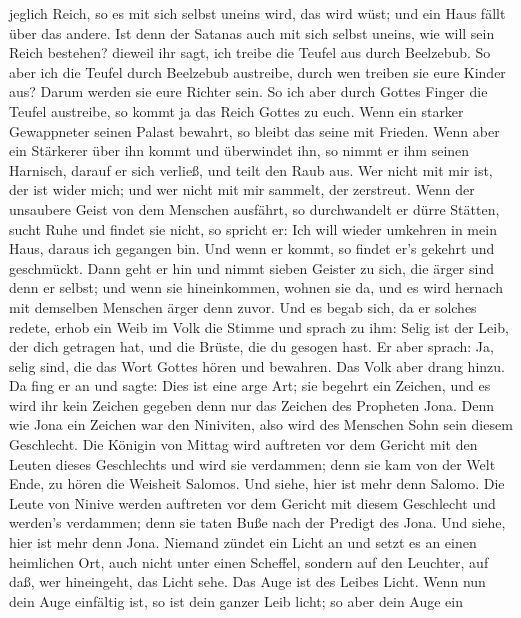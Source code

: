 jeglich Reich, so es mit sich selbst uneins wird, das wird wüst; und ein
Haus fällt über das andere.  Ist denn der Satanas auch mit
sich selbst uneins, wie will sein Reich bestehen? dieweil ihr sagt, ich
treibe die Teufel aus durch Beelzebub.  So aber ich die
Teufel durch Beelzebub austreibe, durch wen treiben sie eure Kinder aus?
Darum werden sie eure Richter sein.  So ich aber durch
Gottes Finger die Teufel austreibe, so kommt ja das Reich Gottes zu
euch.  Wenn ein starker Gewappneter seinen Palast bewahrt,
so bleibt das seine mit Frieden.  Wenn aber ein Stärkerer
über ihn kommt und überwindet ihn, so nimmt er ihm seinen Harnisch,
darauf er sich verließ, und teilt den Raub aus.  Wer nicht
mit mir ist, der ist wider mich; und wer nicht mit mir sammelt, der
zerstreut.  Wenn der unsaubere Geist von dem Menschen
ausfährt, so durchwandelt er dürre Stätten, sucht Ruhe und findet sie
nicht, so spricht er: Ich will wieder umkehren in mein Haus, daraus ich
gegangen bin.  Und wenn er kommt, so findet er's gekehrt
und geschmückt.  Dann geht er hin und nimmt sieben Geister
zu sich, die ärger sind denn er selbst; und wenn sie hineinkommen,
wohnen sie da, und es wird hernach mit demselben Menschen ärger denn
zuvor.  Und es begab sich, da er solches redete, erhob ein
Weib im Volk die Stimme und sprach zu ihm: Selig ist der Leib, der dich
getragen hat, und die Brüste, die du gesogen hast.  Er aber
sprach: Ja, selig sind, die das Wort Gottes hören und bewahren.
 Das Volk aber drang hinzu. Da fing er an und sagte: Dies
ist eine arge Art; sie begehrt ein Zeichen, und es wird ihr kein Zeichen
gegeben denn nur das Zeichen des Propheten Jona.  Denn wie
Jona ein Zeichen war den Niniviten, also wird des Menschen Sohn sein
diesem Geschlecht.  Die Königin von Mittag wird auftreten
vor dem Gericht mit den Leuten dieses Geschlechts und wird sie
verdammen; denn sie kam von der Welt Ende, zu hören die Weisheit
Salomos. Und siehe, hier ist mehr denn Salomo.  Die Leute
von Ninive werden auftreten vor dem Gericht mit diesem Geschlecht und
werden's verdammen; denn sie taten Buße nach der Predigt des Jona. Und
siehe, hier ist mehr denn Jona.  Niemand zündet ein Licht
an und setzt es an einen heimlichen Ort, auch nicht unter einen
Scheffel, sondern auf den Leuchter, auf daß, wer hineingeht, das Licht
sehe.  Das Auge ist des Leibes Licht. Wenn nun dein Auge
einfältig ist, so ist dein ganzer Leib licht; so aber dein Auge ein
